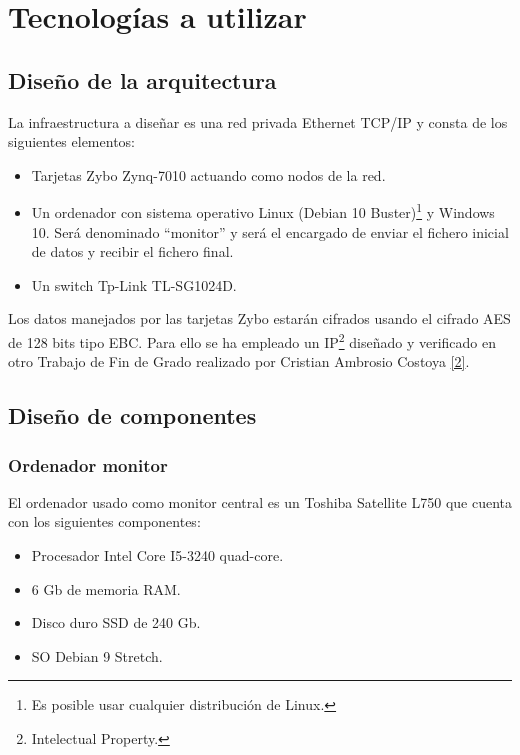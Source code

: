 \section{Tecnologías a utilizar}
\subsection{Diseño de la arquitectura}
La infraestructura a diseñar es una red privada Ethernet TCP/IP y consta de los siguientes elementos:
\begin{itemize}
	\item Tarjetas Zybo Zynq-7010 actuando como nodos de la red.
	\item Un ordenador con sistema operativo Linux (Debian 10 Buster)\footnote{Es posible usar cualquier distribución de Linux.} y Windows 10. Será denominado ``monitor'' y será el encargado de enviar el fichero inicial de datos y recibir el fichero final.
	\item Un switch Tp-Link TL-SG1024D.
\end{itemize}

Los datos manejados por las tarjetas Zybo estarán cifrados usando el cifrado AES de 128 bits tipo EBC. Para ello se ha empleado un IP\footnote{Intelectual Property.} diseñado y verificado en otro Trabajo de Fin de Grado realizado por Cristian Ambrosio Costoya \hyperlink{2}{[2]}.

\subsection{Diseño de componentes}
\subsubsection{Ordenador monitor}
El ordenador usado como monitor central es un Toshiba Satellite L750 que cuenta con los siguientes componentes:
\begin{itemize}
	\item Procesador Intel Core I5-3240 quad-core.
	\item 6 Gb de memoria RAM.
	\item Disco duro SSD de 240 Gb.
	\item SO Debian 9 Stretch.
\end{itemize}

